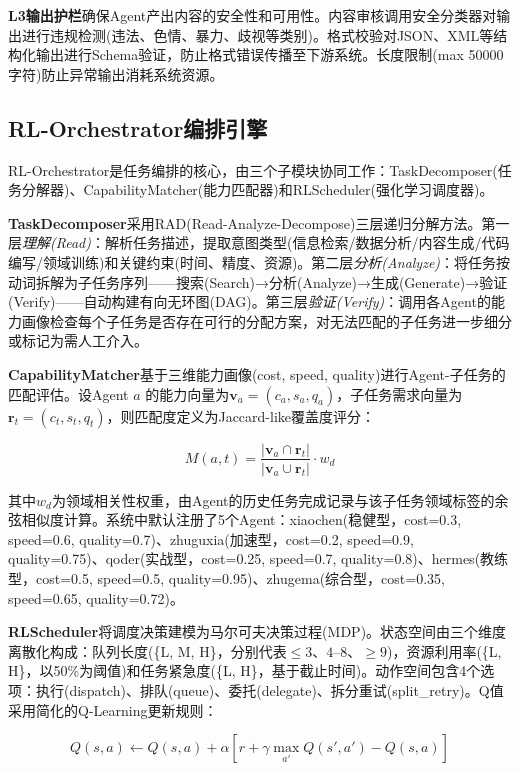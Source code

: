 \documentclass[12pt,a4paper]{ctexart}
\begin{document}
\textbf{L3输出护栏}确保Agent产出内容的安全性和可用性。内容审核调用安全分类器对输出进行违规检测(违法、色情、暴力、歧视等类别)。格式校验对JSON、XML等结构化输出进行Schema验证，防止格式错误传播至下游系统。长度限制(max 50000字符)防止异常输出消耗系统资源。

\subsection{RL-Orchestrator编排引擎}

RL-Orchestrator是任务编排的核心，由三个子模块协同工作：TaskDecomposer(任务分解器)、CapabilityMatcher(能力匹配器)和RLScheduler(强化学习调度器)。

\textbf{TaskDecomposer}采用RAD(Read-Analyze-Decompose)三层递归分解方法。第一层\emph{理解(Read)}：解析任务描述，提取意图类型(信息检索/数据分析/内容生成/代码编写/领域训练)和关键约束(时间、精度、资源)。第二层\emph{分析(Analyze)}：将任务按动词拆解为子任务序列——搜索(Search)→分析(Analyze)→生成(Generate)→验证(Verify)——自动构建有向无环图(DAG)。第三层\emph{验证(Verify)}：调用各Agent的能力画像检查每个子任务是否存在可行的分配方案，对无法匹配的子任务进一步细分或标记为需人工介入。

\textbf{CapabilityMatcher}基于三维能力画像(cost, speed, quality)进行Agent-子任务的匹配评估。设Agent $a$ 的能力向量为$\mathbf{v}_a = (c_a, s_a, q_a)$，子任务需求向量为$\mathbf{r}_t = (c_t, s_t, q_t)$，则匹配度定义为Jaccard-like覆盖度评分：

\begin{equation}
M(a, t) = \frac{|\mathbf{v}_a \cap \mathbf{r}_t|}{|\mathbf{v}_a \cup \mathbf{r}_t|} \cdot w_d
\label{eq:capability_match}
\end{equation}

其中$w_d$为领域相关性权重，由Agent的历史任务完成记录与该子任务领域标签的余弦相似度计算。系统中默认注册了5个Agent：xiaochen(稳健型，cost=0.3, speed=0.6, quality=0.7)、zhuguxia(加速型，cost=0.2, speed=0.9, quality=0.75)、qoder(实战型，cost=0.25, speed=0.7, quality=0.8)、hermes(教练型，cost=0.5, speed=0.5, quality=0.95)、zhugema(综合型，cost=0.35, speed=0.65, quality=0.72)。

\textbf{RLScheduler}将调度决策建模为马尔可夫决策过程(MDP)。状态空间由三个维度离散化构成：队列长度(\{L, M, H\}，分别代表$\leq3$、$4$--$8$、$\geq9$)，资源利用率(\{L, H\}，以50\%为阈值)和任务紧急度(\{L, H\}，基于截止时间)。动作空间包含4个选项：执行(dispatch)、排队(queue)、委托(delegate)、拆分重试(split\_retry)。Q值采用简化的Q-Learning更新规则：

\begin{equation}
Q(s, a) \leftarrow Q(s, a) + \alpha \left[ r + \gamma \max_{a'} Q(s', a') - Q(s, a) \right]
\label{eq:qlearning}
\end{equation}
\end{document}
